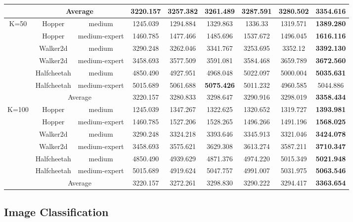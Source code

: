 \begin{table*}[t!]
{\begin{tabular}{c|cc|ccc|ccc}
 & \multicolumn{2}{c|}{Average} & 3220.157 & 3257.382 & 3261.489 & 3287.591 & 3280.502 & \textbf{3354.616} \\ \midrule
\multirow{7}{*}{K=50} & Hopper & medium & 1245.039 & 1294.884 & 1329.863 & 1336.33 & 1319.571 & \textbf{1389.280} \\
 & Hopper & medium-expert & 1460.785 & 1477.466 & 1485.696 & 1537.672 & 1496.045 & \textbf{1616.116} \\
 & Walker2d & medium & 3290.248 & 3262.046 & 3341.767 & 3253.695 & 3352.12 & \textbf{3392.130} \\
 & Walker2d & medium-expert & 3458.693 & 3577.509 & 3591.081 & 3584.468 & 3659.789 & \textbf{3672.560} \\
 & Halfcheetah & medium & 4850.490 & 4927.951 & 4968.048 & 5022.097 & 5000.004 & \textbf{5035.631} \\
 & Halfcheetah & medium-expert & 5015.689  & 5061.688 & \textbf{5075.426} & 5011.232 & 4960.585 & 5044.886 \\ \cmidrule{2-9}
 & \multicolumn{2}{c|}{Average} & 3220.157 & 3280.833 & 3298.647 & 3290.916 & 3298.019 & \textbf{3358.434} \\ \midrule
\multirow{7}{*}{K=100} & Hopper & medium & 1245.039 & 1347.267 & 1322.625 & 1320.652 & 1319.727 & \textbf{1393.981} \\
 & Hopper & medium-expert & 1460.785 & 1527.206 & 1528.265 & 1496.266 & 1491.196 & \textbf{1568.025} \\
 & Walker2d & medium & 3290.248 & 3324.218 & 3393.646 & 3345.913 & 3321.046 & \textbf{3424.078} \\
 & Walker2d & medium-expert & 3458.693 & 3575.621 & 3629.308 & 3613.274 & 3587.211 & \textbf{3710.347} \\
 & Halfcheetah & medium & 4850.490 & 4939.629 & 4871.376 & 4974.220 & 5015.349 & \textbf{5021.948} \\
 & Halfcheetah & medium-expert & 5015.689 & 4919.624 & 5047.757 & 4991.007 & 5031.975 & \textbf{5063.546} \\ \cmidrule{2-9}
 & \multicolumn{2}{c|}{Average} & 3220.157 & 3272.261 & 3298.830 & 3290.222 & 3294.417 & \textbf{3363.654} \\ 
 \bottomrule
\end{tabular}
}
\end{table*}

\subsection{Image Classification}

